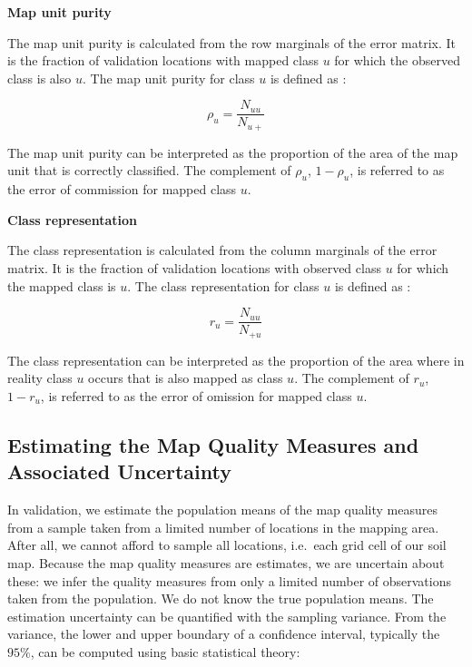 \documentclass[10pt,b5paper,]{book}
\theoremstyle{definition}
\theoremstyle{definition}
\theoremstyle{definition}
\theoremstyle{remark}
\begin{document}
\textbf{Map unit purity}

The map unit purity is calculated from the row marginals of the error
matrix. It is the fraction of validation locations with mapped class
\(u\) for which the observed class is also \(u\). The map unit purity
for class \(u\) is defined as \citep{brus2011sampling}:

\begin{equation}
\rho_u = \frac{ N_{uu}}{N_{u+}}
\end{equation}

The map unit purity can be interpreted as the proportion of the area of
the map unit that is correctly classified. The complement of \(\rho_u\),
\(1 - \rho_u\), is referred to as the error of commission for mapped
class \(u\).

\textbf{Class representation}

The class representation is calculated from the column marginals of the
error matrix. It is the fraction of validation locations with observed
class \(u\) for which the mapped class is \(u\). The class
representation for class \(u\) is defined as \citep{brus2011sampling}:

\begin{equation}
r_u = \frac{ N_{uu}}{N_{+u}}
\end{equation}

The class representation can be interpreted as the proportion of the
area where in reality class \(u\) occurs that is also mapped as class
\(u\). The complement of \(r_u\), \(1 - r_u\), is referred to as the
error of omission for mapped class \(u\).

\hypertarget{estimating-the-map-quality-measures-and-associated-uncertainty}{%
\subsection{Estimating the Map Quality Measures and Associated
Uncertainty}\label{estimating-the-map-quality-measures-and-associated-uncertainty}}

In validation, we estimate the population means of the map quality
measures from a sample taken from a limited number of locations in the
mapping area. After all, we cannot afford to sample all locations,
i.e.~each grid cell of our soil map. Because the map quality measures
are estimates, we are uncertain about these: we infer the quality
measures from only a limited number of observations taken from the
population. We do not know the true population means. The estimation
uncertainty can be quantified with the sampling variance. From the
variance, the lower and upper boundary of a confidence interval,
typically the \(95\%\), can be computed using basic statistical theory:
\end{document}
